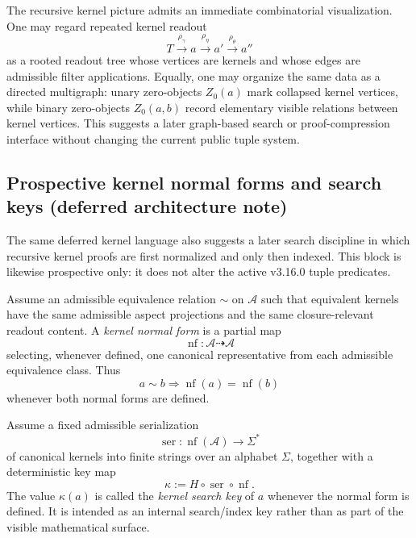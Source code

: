 \begin{remark}\label{rem:qam-zero-graph}
The recursive kernel picture admits an immediate combinatorial visualization. One may regard repeated kernel readout
\[
T \xrightarrow{\rho_\gamma} a \xrightarrow{\rho_\eta} a' \xrightarrow{\rho_\theta} a''
\]
as a rooted readout tree whose vertices are kernels and whose edges are admissible filter applications. Equally, one may organize the same data as a directed multigraph: unary zero-objects $Z_0(a)$ mark collapsed kernel vertices, while binary zero-objects $Z_0(a,b)$ record elementary visible relations between kernel vertices. This suggests a later graph-based search or proof-compression interface without changing the current public tuple system.
\end{remark}


\subsection*{Prospective kernel normal forms and search keys (deferred architecture note)}

The same deferred kernel language also suggests a later search discipline in which recursive kernel proofs are first normalized and only then indexed. This block is likewise prospective only: it does not alter the active v3.16.0 tuple predicates.

\begin{definition}\label{def:qam-kernel-normal-form}
Assume an admissible equivalence relation $\sim$ on $\mathcal A$ such that equivalent kernels have the same admissible aspect projections and the same closure-relevant readout content. A \emph{kernel normal form} is a partial map
\[
\operatorname{nf}:\mathcal A \dashrightarrow \mathcal A
\]
selecting, whenever defined, one canonical representative from each admissible equivalence class. Thus
\[
a\sim b \Longrightarrow \operatorname{nf}(a)=\operatorname{nf}(b)
\]
whenever both normal forms are defined.
\end{definition}

\begin{definition}\label{def:qam-kernel-key}
Assume a fixed admissible serialization
\[
\operatorname{ser}:\operatorname{nf}(\mathcal A)\to \Sigma^*
\]
of canonical kernels into finite strings over an alphabet $\Sigma$, together with a deterministic key map
\[
\kappa := H\circ \operatorname{ser}\circ \operatorname{nf}.
\]
The value $\kappa(a)$ is called the \emph{kernel search key} of $a$ whenever the normal form is defined. It is intended as an internal search/index key rather than as part of the visible mathematical surface.
\end{definition}

